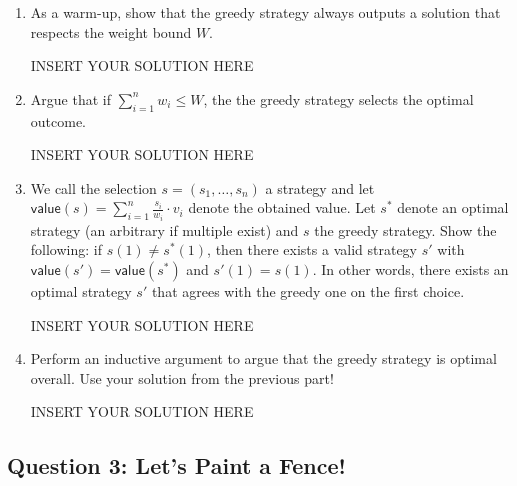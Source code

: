 \begin{enumerate}
    \item As a warm-up, show that the greedy strategy always outputs a solution that respects the weight bound $W$.
\begin{solution}   INSERT YOUR SOLUTION HERE   \end{solution}

    \item Argue that if $\sum_{i=1}^n w_i \leq W$, the the greedy strategy selects the optimal outcome.
\begin{solution}   INSERT YOUR SOLUTION HERE   \end{solution}


    \item We call the selection $s = (s_1,\ldots,s_n)$ a strategy and let 
    $\mathsf{value}(s) = \sum_{i=1}^n \frac{s_i}{w_i} \cdot v_i$ 
    denote the obtained value. Let $s^*$ denote an optimal strategy (an arbitrary if multiple exist) and $s$ the greedy strategy.
    Show the following: if $s(1) \neq s^*(1)$, then there exists a valid strategy $s'$ with $\mathsf{value}(s') = \mathsf{value}(s^*)$ and $s'(1) = s(1)$. In other words, there exists an optimal strategy $s'$ that agrees with the greedy one on the first choice.
\begin{solution}   INSERT YOUR SOLUTION HERE   \end{solution}

    \item Perform an inductive argument to argue that the greedy strategy is optimal overall. Use your solution from the previous part!
\begin{solution}   INSERT YOUR SOLUTION HERE   \end{solution}
\end{enumerate}




\subsection*{Question 3: Let's Paint a Fence!}

